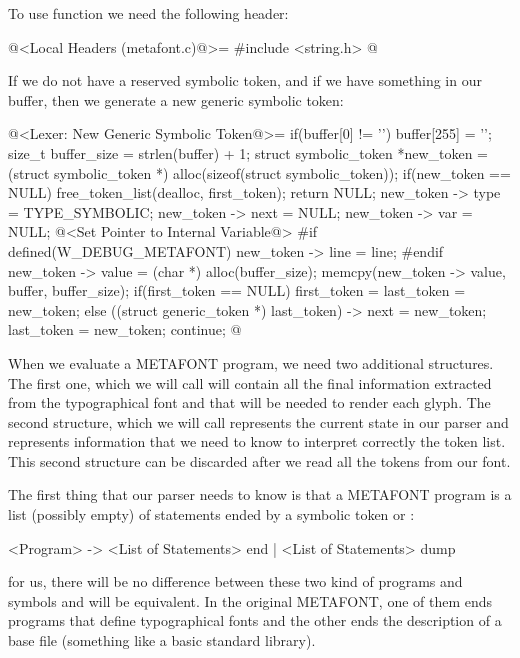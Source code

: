 To use function  we need the following header:

\iniciocodigo
@<Local Headers (metafont.c)@>=
#include <string.h>
@
\fimcodigo


If we do not have a reserved symbolic token, and if we have something
in our buffer, then we generate a new generic symbolic token:

\iniciocodigo
@<Lexer: New Generic Symbolic Token@>=
if(buffer[0] != '\0'){
  buffer[255] = '\0';
  size_t buffer_size = strlen(buffer) + 1;
  struct symbolic_token *new_token =
     (struct symbolic_token *) alloc(sizeof(struct symbolic_token));
  if(new_token == NULL){
    free_token_list(dealloc, first_token);
    return NULL;
  }
  new_token -> type = TYPE_SYMBOLIC;
  new_token -> next = NULL;
  new_token -> var = NULL;
  @<Set Pointer to Internal Variable@>
#if defined(W_DEBUG_METAFONT)
  new_token -> line = line;
#endif
  new_token -> value = (char *) alloc(buffer_size);
  memcpy(new_token -> value, buffer, buffer_size);
  if(first_token == NULL)
    first_token = last_token = new_token;
  else{
    ((struct generic_token *) last_token) -> next = new_token;
    last_token = new_token;
  }
  continue;
}
@
\fimcodigo


When we evaluate a METAFONT program, we need two additional
structures. The first one, which we will call  will contain all the final information extracted from the
typographical font and that will be needed to render each glyph. The
second structure, which we will call 
represents the current state in our parser and represents information
that we need to know to interpret correctly the token list. This
second structure can be discarded after we read all the tokens from
our font.

The first thing that our parser needs to know is that a METAFONT
program is a list (possibly empty) of statements ended by a symbolic
token  or :

\alinhaverbatim
<Program> -> <List of Statements> end | <List of Statements> dump
\alinhanormal

for us, there will be no difference between these two kind of programs
and symbols  and  will be
equivalent. In the original METAFONT, one of them ends programs that
define typographical fonts and the other ends the description of a
base file (something like a basic standard library).

